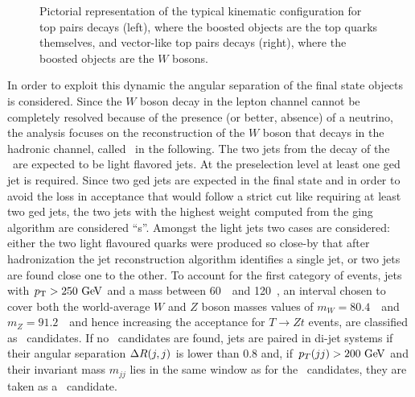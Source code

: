 \begin{figure}[htb]\begin{center}
	\caption{Pictorial representation of the typical kinematic configuration
        for top pairs decays (left), where the boosted objects are the top
        quarks themselves, and vector-like top pairs decays (right), where the
        boosted objects are the $W$ bosons.\label{fig:boostedkin}}
\end{center}\end{figure}

In order to exploit this dynamic the angular separation of the final state
objects is considered. Since the $W$ boson decay
in the lepton channel cannot be completely resolved because of
the presence (or better, absence) of a neutrino, the analysis
focuses on the reconstruction of the $W$ boson that decays in the hadronic
channel, called \whad\ in the following.
The two jets from the decay of the \whad\ are expected to be
light flavored jets. At the preselection level at least
one \btag ged jet is required. Since two \btag ged jets are expected in
the final state and in order to avoid the loss in acceptance that would follow a strict
cut like requiring at least two \btag ged jets, the two jets with the 
highest weight computed from the \btag ging algorithm are considered ``\bjet s''.
Amongst the light jets two cases are considered: either the two light flavoured
quarks were produced so close-by that after hadronization the jet reconstruction
algorithm identifies a single jet, or two jets are found close one to the other.
To account for the first category of events, jets with $\pt>250\gev$ and a mass
between 60~\gev\ and 120~\gev, an interval chosen to cover both the world-average 
$W$ and $Z$ boson masses values of $m_W = 80.4$~\gev\ and $m_Z = 91.2$~\gev\ and
hence increasing the acceptance for $T\to Zt$ events, are 
classified as \wi\ candidates. If no \wi\ candidates are found, jets are paired
in di-jet systems if their angular separation $\dr(j,j)$ is lower than 0.8 and, if
$p_T(jj)>200\gev$ and 
their invariant mass $m_{jj}$ lies in the same window as for the \wi\ candidates, they 
are taken as a \wii\ candidate.


